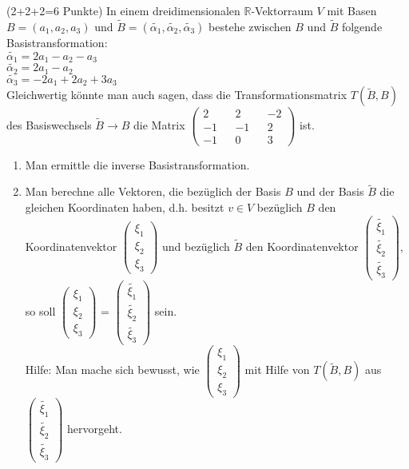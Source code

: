 \documentclass{uebblatt}
\begin{document}
\begin{aufgabe}{ (2+2+2=6 Punkte)}
In einem dreidimensionalen $\mathbb{R}$-Vektorraum $V$ mit Basen $B = (a_1, a_2, a_3)$ und $\widetilde{B} = (\tilde{\alpha_1}, \tilde{\alpha_2}, \tilde{\alpha_3})$ bestehe zwischen $B$ und $\widetilde{B}$ folgende Basistransformation:\\
$\tilde{\alpha_1} = 2a_1 - a_2 - a_3$ \\
$\tilde{\alpha_2} = 2a_1 - a_2$ \\
$\tilde{\alpha_3} = -2a_1 + 2a_2 + 3a_3$ \\
Gleichwertig könnte man auch sagen, dass die Transformationsmatrix $T(\widetilde{B}, B)$ des Basiswechsels $\widetilde{B} \to B$ die Matrix 
$\begin{pmatrix} 2 && 2 && -2 \\
-1 && -1 && 2 \\
-1 && 0 && 3 \end{pmatrix}$ ist.
\begin{enumerate}
\item Man ermittle die inverse Basistransformation.
\item Man berechne alle Vektoren, die bezüglich der Basis $B$ und der Basis $\widetilde{B}$ die gleichen Koordinaten haben, d.h. besitzt $v \in V$ bezüglich $B$ den Koordinatenvektor 
$\begin{pmatrix} \xi_1 \\ \xi_2 \\ \xi_3 \end{pmatrix}$ und bezüglich $\widetilde{B}$ den Koordinatenvektor 
$\begin{pmatrix} \tilde{\xi_1} \\ \tilde{\xi_2} \\ \tilde{\xi_3} \end{pmatrix}$, so soll 
$\begin{pmatrix} \xi_1 \\ \xi_2 \\ \xi_3 \end{pmatrix}$ = $\begin{pmatrix} \tilde{\xi_1} \\ \tilde{\xi_2} \\ \tilde{\xi_3} \end{pmatrix}$ sein. \\
Hilfe: Man mache sich bewusst, wie $\begin{pmatrix} \xi_1 \\ \xi_2 \\ \xi_3 \end{pmatrix}$ mit Hilfe von $T(\widetilde{B}, B)$ aus $\begin{pmatrix} \tilde{\xi_1} \\ \tilde{\xi_2} \\ \tilde{\xi_3} \end{pmatrix}$ hervorgeht.

\end{enumerate}
\end{aufgabe}
\end{document}
